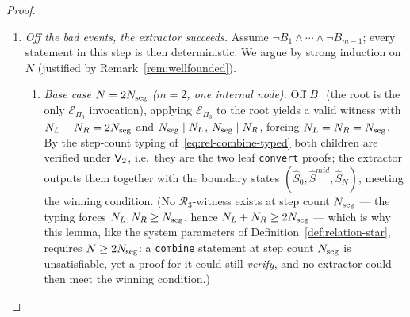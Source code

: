 \begin{proof}
\begin{enumerate}[label=\textbf{Step~\arabic*.},leftmargin=*,itemsep=5pt]
\item \emph{Off the bad events, the extractor succeeds.}
  Assume $\neg B_1\wedge\cdots\wedge\neg B_{m-1}$; every statement in this step
  is then deterministic. We argue by strong induction on $N$ (justified by
  Remark~\ref{rem:wellfounded}).
  \begin{enumerate}[label=(\alph*),leftmargin=*,topsep=3pt]
  \item \emph{Base case $N=2N_{\mathrm{seg}}$ ($m=2$, one internal node).}
    Off $B_1$ (the root is the only $\mathcal{E}_{\Pi_3}$ invocation),
    applying $\mathcal{E}_{\Pi_3}$ to the root yields a valid witness with
    $N_L+N_R=2N_{\mathrm{seg}}$ and $N_{\mathrm{seg}}\mid N_L$, $N_{\mathrm{seg}}\mid N_R$, forcing
    $N_L=N_R=N_{\mathrm{seg}}$.  By the step-count typing
    of~\eqref{eq:rel-combine-typed} both children are verified under
    $\mathsf{V}_2$, i.e.\ they are the two leaf \texttt{convert} proofs; the
    extractor outputs them together with the boundary states
    $(\hat{S}_0,\hat{S}^{mid},\hat{S}_N)$, meeting the winning condition.
    (No $\mathcal{R}_3$-witness exists at step count $N_{\mathrm{seg}}$ --- the
    typing forces $N_L,N_R\ge N_{\mathrm{seg}}$, hence $N_L+N_R\ge 2N_{\mathrm{seg}}$ ---
    which is why this lemma, like the system parameters of
    Definition~\ref{def:relation-star}, requires $N\ge 2N_{\mathrm{seg}}$: a \texttt{combine}
    statement at step count $N_{\mathrm{seg}}$ is unsatisfiable, yet a proof for it
    could still \emph{verify}, and no extractor could then meet the winning
    condition.)


\end{enumerate}
\end{enumerate}
\end{proof}
